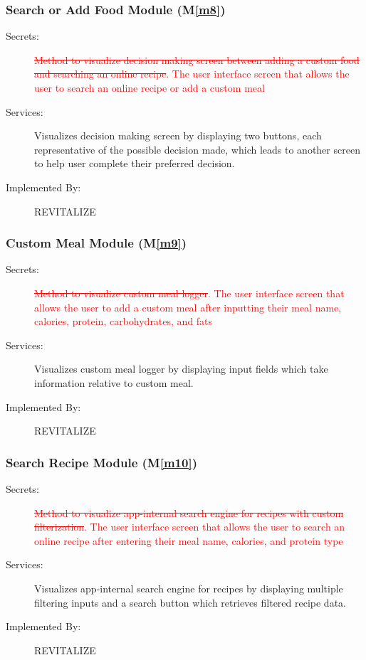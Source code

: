 \documentclass[12pt, titlepage]{article}
\newcommand{\mref}[1]{M\ref{#1}}
\begin{document}
\subsubsection{Search or Add Food Module (\mref{m8})}
\begin{description}
	\item[Secrets:]\textcolor{red}{\sout{Method to visualize decision making screen between adding a custom food and searching an online recipe}}\textcolor{red}{. The user interface screen that allows the user to search an online recipe or add a custom meal}
	\item[Services:]Visualizes decision making screen by displaying two buttons, each representative of the possible decision made, which leads to another screen to help user complete their preferred decision.
	\item[Implemented By:] REVITALIZE
\end{description}

\subsubsection{Custom Meal Module (\mref{m9})}
\begin{description}
	\item[Secrets:]\textcolor{red}{\sout{Method to visualize custom meal logger}}\textcolor{red}{. The user interface screen that allows the user to add a custom meal after inputting their meal name, calories, protein, carbohydrates, and fats}
	\item[Services:]Visualizes custom meal logger by displaying input fields which take information relative to custom meal.
	\item[Implemented By:] REVITALIZE
\end{description}

\subsubsection{Search Recipe Module (\mref{m10})}
\begin{description}
	\item[Secrets:]\textcolor{red}{\sout{Method to visualize app-internal search engine for recipes with custom filterization}}\textcolor{red}{. The user interface screen that allows the user to search an online recipe after entering their meal name, calories, and protein type}
	\item[Services:]Visualizes app-internal search engine for recipes by displaying multiple filtering inputs and a search button which retrieves filtered recipe data.
	\item[Implemented By:] REVITALIZE
\end{description}
\end{document}
